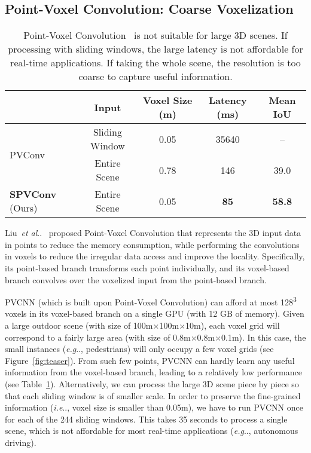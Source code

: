 \documentclass[runningheads]{llncs}
\makeatletter
\newcommand{\fig}[1]{Figure~\ref{#1}}
\newcommand{\tab}[1]{Table~\ref{#1}}
\DeclareRobustCommand\onedot{\futurelet\@let@token\@onedot}
\def\@onedot{\ifx\@let@token.\else.\null\fi\xspace}
\def\eg{\emph{e.g}\onedot} \def\Eg{\emph{E.g}\onedot}
\def\ie{\emph{i.e}\onedot} \def\Ie{\emph{I.e}\onedot}
\def\etal{\emph{et al}\onedot}
\def\moduleshort{SPVConv\xspace}
\makeatother
\begin{document}
\subsection{Point-Voxel Convolution: Coarse Voxelization}

\begin{table}[t]
\setlength{\tabcolsep}{5.5pt}
\small\centering
\begin{tabular}{lcccc}
    \toprule
    & Input & Voxel Size (m) & Latency (ms) & Mean IoU \\
    \midrule
    \multirow{2}{*}{PVConv~\cite{liu2019point}} & Sliding Window & 0.05 & 35640 & -- \\
     & Entire Scene & 0.78 & 146 & 39.0 \\
    \midrule
    \textbf{\moduleshort} (Ours) & Entire Scene & 0.05 & \textbf{85} & \textbf{58.8} \\
    \bottomrule
\end{tabular}
\caption{Point-Voxel Convolution~\cite{liu2019point} is not suitable for large 3D scenes. If processing with sliding windows, the large latency is not affordable for real-time applications. If taking the whole scene, the resolution is too coarse to capture useful information.}
\label{tab:limitation}
\end{table} 
Liu~\etal~\cite{liu2019point} proposed Point-Voxel Convolution that represents the 3D input data in points to reduce the memory consumption, while performing the convolutions in voxels to reduce the irregular data access and improve the locality. Specifically, its point-based branch transforms each point individually, and its voxel-based branch convolves over the voxelized input from the point-based branch.

PVCNN (which is built upon Point-Voxel Convolution) can afford at most 128\textsuperscript{3} voxels in its voxel-based branch on a single GPU (with 12 GB of memory). Given a large outdoor scene (with size of 100m$\times$100m$\times$10m), each voxel grid will correspond to a fairly large area (with size of 0.8m$\times$0.8m$\times$0.1m). In this case, the small instances (\eg, pedestrians) will only occupy a few voxel grids (see \fig{fig:teaser}). From such few points, PVCNN can hardly learn any useful information from the voxel-based branch, leading to a relatively low performance (see \tab{tab:limitation}). Alternatively, we can process the large 3D scene piece by piece so that each sliding window is of smaller scale. In order to preserve the fine-grained information (\ie, voxel size is smaller than 0.05m), we have to run PVCNN once for each of the 244 sliding windows. This takes 35 seconds to process a single scene, which is not affordable for most real-time applications (\eg, autonomous driving).
\end{document}
